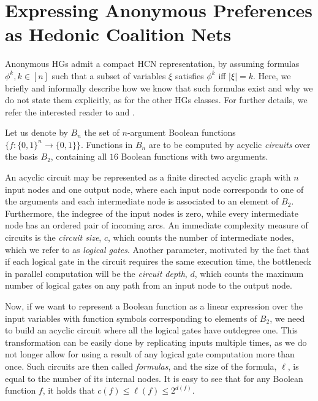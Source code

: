 \documentclass[letterpaper]{article} %
\newcommand{\modulus}[1]{\vert #1 \vert}
\begin{document}
\section{Expressing Anonymous Preferences as Hedonic Coalition Nets}\label{apx:anonymous_HCN}
Anonymous HGs admit a compact HCN representation, by assuming formulas $\phi^k, k\in[n]$ such that a subset of variables $\xi$ satisfies $\phi^k$ iff $\modulus{\xi} = k$. Here, we briefly and informally describe how we know that such formulas exist and why we do not state them explicitly, as for the other HGs classes. For further details, we refer the interested reader to \citet{paterson1976introduction} and \citet{wegener1987complexity}.

Let us denote by $B_n$ the set of $n$-argument Boolean functions $\{f: \{0,1\}^n \to \{0,1\}\}$. Functions in $B_n$ are to be computed by acyclic \emph{circuits} over the basis $B_2$, containing all $16$ Boolean functions with two arguments. 

An acyclic circuit may be represented as a finite directed acyclic graph with $n$ input nodes and one output node, where each input node corresponds to one of the arguments and each intermediate node is associated to an element of $B_2$. Furthermore, the indegree of the input nodes is zero, while every intermediate node has an ordered pair of incoming arcs. An immediate complexity measure of circuits is the \emph{circuit size}, $c$, which counts the number of intermediate nodes, which we refer to as \emph{logical gates}. Another parameter, motivated by the fact that if each logical gate in the circuit requires the same execution time, the bottleneck in parallel computation will be the \emph{circuit depth}, $d$, which counts the maximum number of logical gates on any path from an input node to the output node. 

Now, if we want to represent a Boolean function as a linear expression over the input variables with function symbols corresponding to elements of $B_2$, we need to build an acyclic circuit where all the logical gates have outdegree one. This transformation can be easily done by replicating inputs multiple times, as we do not longer allow for using a result of any logical gate computation more than once. Such circuits are then called \emph{formulas}, and the size of the formula, $\ell$, is equal to the number of its internal nodes. It is easy to see that for any Boolean function $f$, it holds that $c(f)\le \ell(f) \le 2^{d(f)}$.
\end{document}
